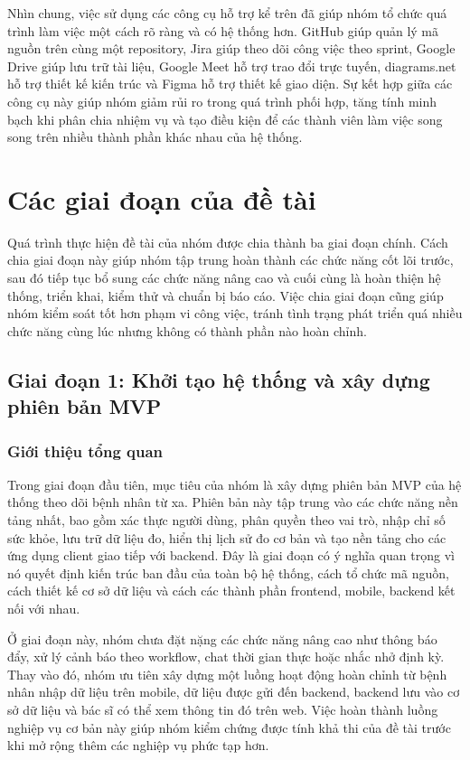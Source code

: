 \par Nhìn chung, việc sử dụng các công cụ hỗ trợ kể trên đã giúp nhóm tổ chức quá trình làm việc một cách rõ ràng và có hệ thống hơn. GitHub giúp quản lý mã nguồn trên cùng một repository, Jira giúp theo dõi công việc theo sprint, Google Drive giúp lưu trữ tài liệu, Google Meet hỗ trợ trao đổi trực tuyến, diagrams.net hỗ trợ thiết kế kiến trúc và Figma hỗ trợ thiết kế giao diện. Sự kết hợp giữa các công cụ này giúp nhóm giảm rủi ro trong quá trình phối hợp, tăng tính minh bạch khi phân chia nhiệm vụ và tạo điều kiện để các thành viên làm việc song song trên nhiều thành phần khác nhau của hệ thống.

\section{Các giai đoạn của đề tài}
\par Quá trình thực hiện đề tài của nhóm được chia thành ba giai đoạn chính. Cách chia giai đoạn này giúp nhóm tập trung hoàn thành các chức năng cốt lõi trước, sau đó tiếp tục bổ sung các chức năng nâng cao và cuối cùng là hoàn thiện hệ thống, triển khai, kiểm thử và chuẩn bị báo cáo. Việc chia giai đoạn cũng giúp nhóm kiểm soát tốt hơn phạm vi công việc, tránh tình trạng phát triển quá nhiều chức năng cùng lúc nhưng không có thành phần nào hoàn chỉnh.

\subsection{Giai đoạn 1: Khởi tạo hệ thống và xây dựng phiên bản MVP}

\subsubsection{Giới thiệu tổng quan}
\par Trong giai đoạn đầu tiên, mục tiêu của nhóm là xây dựng phiên bản MVP của hệ thống theo dõi bệnh nhân từ xa. Phiên bản này tập trung vào các chức năng nền tảng nhất, bao gồm xác thực người dùng, phân quyền theo vai trò, nhập chỉ số sức khỏe, lưu trữ dữ liệu đo, hiển thị lịch sử đo cơ bản và tạo nền tảng cho các ứng dụng client giao tiếp với backend. Đây là giai đoạn có ý nghĩa quan trọng vì nó quyết định kiến trúc ban đầu của toàn bộ hệ thống, cách tổ chức mã nguồn, cách thiết kế cơ sở dữ liệu và cách các thành phần frontend, mobile, backend kết nối với nhau.

\par Ở giai đoạn này, nhóm chưa đặt nặng các chức năng nâng cao như thông báo đẩy, xử lý cảnh báo theo workflow, chat thời gian thực hoặc nhắc nhở định kỳ. Thay vào đó, nhóm ưu tiên xây dựng một luồng hoạt động hoàn chỉnh từ bệnh nhân nhập dữ liệu trên mobile, dữ liệu được gửi đến backend, backend lưu vào cơ sở dữ liệu và bác sĩ có thể xem thông tin đó trên web. Việc hoàn thành luồng nghiệp vụ cơ bản này giúp nhóm kiểm chứng được tính khả thi của đề tài trước khi mở rộng thêm các nghiệp vụ phức tạp hơn.

